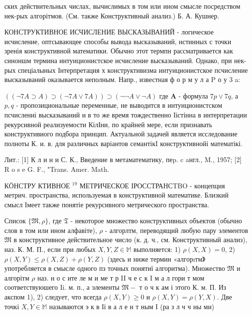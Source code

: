 \documentclass[10pt]{article}
\begin{document}
ских действительных числах, вычислимых в том или ином смысле посредством нек-рых алгорітмов. (См. также Конструктивный анализ.) Б. А. Кушнер.



КОНСТРУКТИВНОЕ ИСЧИСЛЕНИЕ ВЫСКАЗЫВАНИЙ - логическое исчисление, оптсывающее способы вывода высказываний, нстинных с точки зренія конструктивной математики. Обычно этот термпн рассматривается как синоншм термина интуиционистское исчисление высказываний. Однако, при нек-рых спеціалыных Інтерпретация х конструктивизма интуиционистское псчисление высказываний оказывается неполным. Напр., известная ф о р м у л а $\mathrm{P}$ о у 3 a:



$((\neg 7 A \supset A) \supset(\neg 7 A \vee 7 A)) \supset(\neg \neg A \vee \neg A)$ где $\boldsymbol{A}$ - формула $7 p \vee 7 q$, а $p, q$ - пропозициональные переменные, не выводится в интуиционистском псчислениі высказываний и в то же время тождественно Іістінна в интерпретации рекурсивной реализуемости КілІни, по крайней мере, если признавать конструктивиого подбора принцип. Актуальной задачей является исследование полноты К. и. в. для различных варіантов семантікI конструктивнойі математікі.



Лит.: [1] К л и н и С. К., Введение в метаматематику, пеp. c aнгл., M., 1957; [2] R o s e G. F., "Trans. Amer. Math.



КӦНСТРУ КТИВНОЕ ${ }^{19}$ МЕТРИЧЕСКОЕ ІРОССТРАНСTBO - концепция метрич. пространства, используемая в конструктивной математике. Близкий смысл Імеет также понятіе рекурсивного метрического пространства.



Список $\{\mathfrak{M}, \rho\}$, где $\mathfrak{T}$ - некоторое множество конструктивных объектов (обычно слов в том или ином алфавіте), $\rho$ - алгорлтм, переводящий любую пару элементов $\mathfrak{M}$ в конструктивное действительное число (к. д. ч., см. Конструктивный анализ), наз. К. М. П., если при любых $X, Y, Z \in \mathbb{M}$ выполняется: 1) $\rho(X, X)=0$, 2) $\rho(X, Y) \leqslant \rho(X, Z)+\rho(Y, Z)$ (здесь и ниже термин «алгорıтм》 употребляется в смысле одного пз точных понятиї алгоритма). Множество $\mathfrak{M}$ и алгорітм $\rho$ наз. н о с ите ле м и ме т р II ч е с к I м а л гори т мом соответствуюшего Ii. м. п., а элементы $\mathfrak{M}-$ т о ч к ам і этого К. м. П. Из акспом 1), 2) следует, что всегда $\rho(X, Y) \geqslant 0$ и $\rho(X, Y)=\rho(Y, X)$. Две точкі $X, Y \in \mathbb{M}$ называются э к в Іі в а л е н т ным І (ра з л ч ч ны ми)
\end{document}
